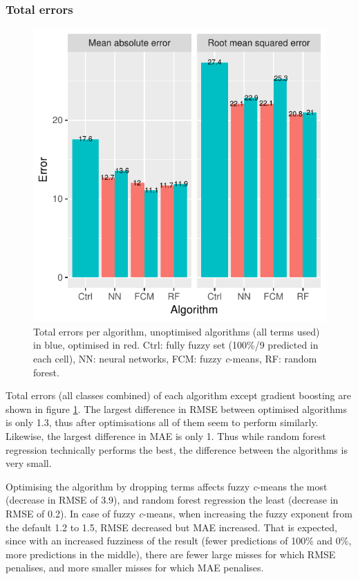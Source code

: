 \documentclass[a4paper,10pt]{book}
\begin{document}
\subsubsection{Total errors}

\begin{figure}
  \centering
  \includegraphics{../plot/total-errors}
  \caption{Total errors per algorithm, unoptimised algorithms (all terms used) in blue, optimised in red. Ctrl: fully fuzzy set (100\%/9 predicted in each cell), NN: neural networks, FCM: fuzzy \textit{c}-means, RF: random forest.}
  \label{fig-total-errors}
\end{figure}

Total errors (all classes combined) of each algorithm except gradient boosting are shown in figure \ref{fig-total-errors}. The largest difference in RMSE between optimised algorithms is only 1.3, thus after optimisations all of them seem to perform similarly. Likewise, the largest difference in MAE is only 1. Thus while random forest regression technically performs the best, the difference between the algorithms is very small.

Optimising the algorithm by dropping terms affects fuzzy \textit{c}-means the most (decrease in RMSE of 3.9), and random forest regression the least (decrease in RMSE of 0.2). In case of fuzzy \textit{c}-means, when increasing the fuzzy exponent from the default 1.2 to 1.5, RMSE decreased but MAE increased. That is expected, since with an increased fuzziness of the result (fewer predictions of 100\% and 0\%, more predictions in the middle), there are fewer large misses for which RMSE penalises, and more smaller misses for which MAE penalises.
\end{document}
